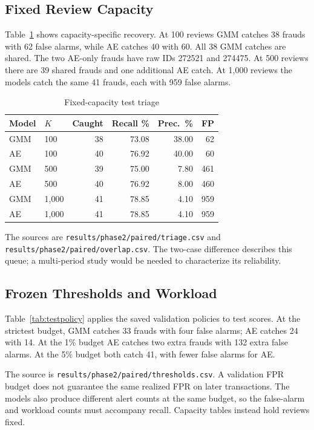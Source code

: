 \documentclass[conference]{IEEEtran}
\newcommand{\artifact}[1]{{\footnotesize\nolinkurl{#1}}}
\begin{document}
\subsection{Fixed Review Capacity}
Table~\ref{tab:capacity} shows capacity-specific recovery. At 100 reviews GMM catches 38 frauds with 62 false alarms, while AE catches 40 with 60. All 38 GMM catches are shared. The two AE-only frauds have raw IDs 272521 and 274475. At 500 reviews there are 39 shared frauds and one additional AE catch. At 1,000 reviews the models catch the same 41 frauds, each with 959 false alarms.

\begin{table}[!ht]
\caption{Fixed-capacity test triage}\label{tab:capacity}
\centering\small
\begin{tabular}{llrrrr}\toprule
Model & $K$ & Caught & Recall \% & Prec.\ \% & FP\\\midrule
GMM & 100 & 38 & 73.08 & 38.00 & 62\\
AE & 100 & 40 & 76.92 & 40.00 & 60\\
GMM & 500 & 39 & 75.00 & 7.80 & 461\\
AE & 500 & 40 & 76.92 & 8.00 & 460\\
GMM & 1,000 & 41 & 78.85 & 4.10 & 959\\
AE & 1,000 & 41 & 78.85 & 4.10 & 959\\\bottomrule
\end{tabular}
\end{table}

The sources are \artifact{results/phase2/paired/triage.csv} and \artifact{results/phase2/paired/overlap.csv}. The two-case difference describes this queue; a multi-period study would be needed to characterize its reliability.

\subsection{Frozen Thresholds and Workload}
Table~\ref{tab:testpolicy} applies the saved validation policies to test scores. At the strictest budget, GMM catches 33 frauds with four false alarms; AE catches 24 with 14. At the 1\% budget AE catches two extra frauds with 132 extra false alarms. At the 5\% budget both catch 41, with fewer false alarms for AE.



The source is \artifact{results/phase2/paired/thresholds.csv}. A validation FPR budget does not guarantee the same realized FPR on later transactions. The models also produce different alert counts at the same budget, so the false-alarm and workload counts must accompany recall. Capacity tables instead hold reviews fixed.
\end{document}
